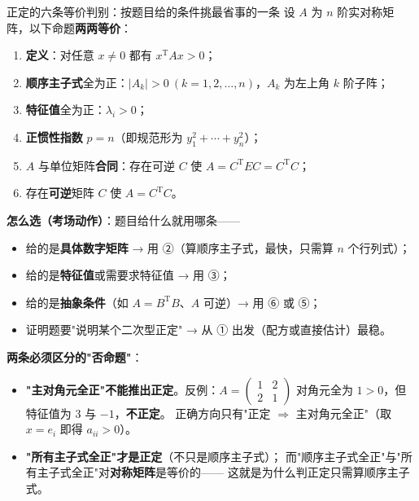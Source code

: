 \begin{fdeep}{正定的六条等价判别：按题目给的条件挑最省事的一条}
设 $A$ 为 $n$ 阶实对称矩阵，以下命题\textbf{两两等价}：
\begin{enumerate}[leftmargin=2.2em,itemsep=0.22em]
\item \textbf{定义}：对任意 $x\ne0$ 都有 $x^{\mathrm T}Ax>0$；
\item \textbf{顺序主子式}全为正：$\lvert A_k\rvert>0\ (k=1,2,\dots,n)$，$A_k$ 为左上角 $k$ 阶子阵；
\item \textbf{特征值}全为正：$\lambda_i>0$；
\item \textbf{正惯性指数} $p=n$（即规范形为 $y_1^{2}+\cdots+y_n^{2}$）；
\item $A$ 与单位矩阵\textbf{合同}：存在可逆 $C$ 使 $A=C^{\mathrm T}EC=C^{\mathrm T}C$；
\item 存在\textbf{可逆}矩阵 $C$ 使 $A=C^{\mathrm T}C$。
\end{enumerate}

\textbf{怎么选（考场动作）}：题目给什么就用哪条——
\begin{itemize}[leftmargin=2.2em,itemsep=0.22em]
\item 给的是\textbf{具体数字矩阵} → 用 ②（算顺序主子式，最快，只需算 $n$ 个行列式）；
\item 给的是\textbf{特征值}或需要求特征值 → 用 ③；
\item 给的是\textbf{抽象条件}（如 $A=B^{\mathrm T}B$、$A$ 可逆）→ 用 ⑥ 或 ⑤；
\item 证明题要"说明某个二次型正定" → 从 ① 出发（配方或直接估计）最稳。
\end{itemize}

\textbf{两条必须区分的"否命题"}：
\begin{itemize}[leftmargin=2.2em,itemsep=0.22em]
\item \textbf{"主对角元全正"不能推出正定}。反例：$A=\begin{pmatrix}1&2\\2&1\end{pmatrix}$
      对角元全为 $1>0$，但特征值为 $3$ 与 $-1$，\textbf{不正定}。
      正确方向只有"正定 $\Rightarrow$ 主对角元全正"（取 $x=e_i$ 即得 $a_{ii}>0$）。
\item \textbf{"所有主子式全正"才是正定}（不只是顺序主子式）；
      而"顺序主子式全正"与"所有主子式全正"对\textbf{对称矩阵}是等价的——
      这就是为什么判正定只需算顺序主子式。
\end{itemize}


\end{fdeep}
